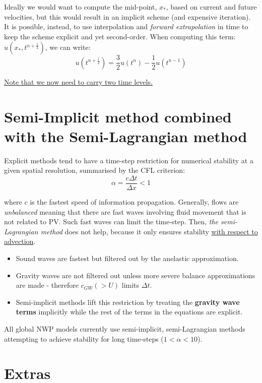 	Ideally we would want to compute the mid-point, $x_*$, based on current and future velocities, but this would result in an implicit scheme (and expensive iteration).\\
	
	It is possible, instead, to use interpolation and \emph{forward extrapolation} in time to keep the scheme explicit and yet second-order. When computing this term: $u(x_*,t^{n+\frac{1}{2}})$, we can write:
	\begin{equation}
	u(t^{n+\frac{1}{2}})=\frac{3}{2}u(t^n)-\frac{1}{2}u(t^{n-1})
	\end{equation}
	
	\underline{Note that we now need to carry two time levels.}
	

\section{Semi-Implicit method combined with the Semi-Lagrangian method}

Explicit methods tend to have a time-step restriction for numerical
stability at a given spatial resolution, summarised by the CFL criterion:
\[
\alpha=\frac{c \Delta t}{\Delta x}< 1
\]

where $c$ is the fastest speed of information propagation. Generally,
flows are {\em unbalanced} meaning that there are fast waves involving
fluid movement that is not related to PV. Such fast waves can limit
the time-step. Then, \emph{the semi-Lagrangian method} does not
help, because it only ensures stability  \underline{with respect to advection}.

\begin{itemize}
\item
Sound waves are fastest but filtered out by the anelastic
approximation.

\item
Gravity waves are not filtered out unless more severe balance
approximations are made - therefore $c_{GW} (> U)$ limits $\Delta t$.

\item
Semi-implicit methods lift this restriction by treating the {\bf
gravity wave terms} implicitly while the rest of the terms in the equations are
explicit.
\end{itemize}

All global NWP models currently use semi-implicit, semi-Lagrangian
methods attempting to achieve stability for long time-steps ($1 < \alpha <
10$).

\section{Extras}

